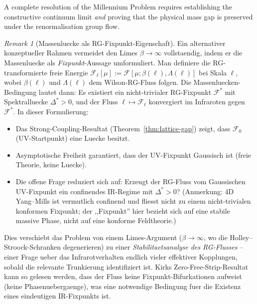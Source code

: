\documentclass[12pt,a4paper]{article}
\theoremstyle{definition}
\theoremstyle{plain}
\theoremstyle{remark}
\newtheorem{remark}[definition]{Remark}
\begin{document}
A complete resolution of the Millennium Problem requires establishing the constructive continuum limit \emph{and} proving that the physical mass gap is preserved under the renormalisation group flow.

\begin{remark}[Massenluecke als RG-Fixpunkt-Eigenschaft]\label{rem:rg-fixpoint}
Ein alternativer konzeptueller Rahmen vermeidet den Limes $\beta \to \infty$
vollstaendig, indem er die Massenluecke als \emph{Fixpunkt}-Aussage
umformuliert. Man definiere die RG-transformierte freie Energie
$\mathcal{F}_\ell[\mu] := \mathcal{F}[\mu; \beta(\ell), \Lambda(\ell)]$
bei Skala $\ell$, wobei $\beta(\ell)$ und $\Lambda(\ell)$ dem
Wilson-RG-Fluss folgen. Die Massenluecken-Bedingung lautet dann: Es
existiert ein nicht-trivialer RG-Fixpunkt $\mathcal{F}^*$ mit
Spektralluecke $\Delta^* > 0$, und der Fluss $\ell \mapsto
\mathcal{F}_\ell$ konvergiert im Infraroten gegen $\mathcal{F}^*$.
In dieser Formulierung:
\begin{itemize}
  \item Das Strong-Coupling-Resultat (Theorem~\ref{thm:lattice-gap}) zeigt,
    dass $\mathcal{F}_0$ (UV-Startpunkt) eine Luecke besitzt.
  \item Asymptotische Freiheit garantiert, dass der UV-Fixpunkt Gaussisch
    ist (freie Theorie, keine Luecke).
  \item Die offene Frage reduziert sich auf: Erzeugt der RG-Fluss vom
    Gaussischen UV-Fixpunkt ein confinendes IR-Regime mit
    $\Delta^* > 0$?
    (Anmerkung: 4D Yang--Mills ist vermutlich confinend und fliesst nicht zu einem nicht-trivialen konformen Fixpunkt; der ,,Fixpunkt'' hier bezieht sich auf eine stabile massive Phase, nicht auf eine konforme Feldtheorie.)
\end{itemize}
Dies verschiebt das Problem von einem Limes-Argument ($\beta \to \infty$,
wo die Holley--Stroock-Schranken degenerieren) zu einer
\emph{Stabilitaetsanalyse des RG-Flusses} -- einer Frage ueber das
Infrarotverhalten endlich vieler effektiver Kopplungen, sobald die
relevante Trunkierung identifiziert ist. Kirks
Zero-Free-Strip-Resultat~\cite{Kirk2026b} kann so gelesen werden, dass
der Fluss keine Fixpunkt-Bifurkationen aufweist (keine
Phasenuebergaenge), was eine notwendige Bedingung fuer die Existenz
eines eindeutigen IR-Fixpunkts ist.
\end{remark}
\end{document}
